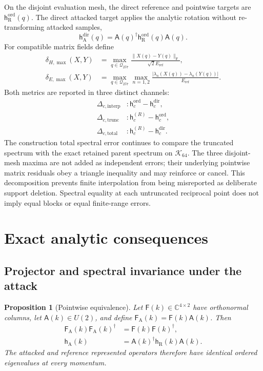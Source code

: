 \documentclass[11pt]{article}
\newcommand{\CC}{\mathbb{C}}
\newcommand{\fro}{\mathrm{F}}
\newcommand{\mat}[1]{\mathsf{#1}}
\newcommand{\eref}{E_{\mathrm{ref}}}
\newtheorem{proposition}{Proposition}
\begin{document}
On the disjoint evaluation mesh, the direct reference and pointwise targets are
$\mat h_{\mathrm R}^{\mathrm{ord}}(q)$.  The direct attacked target applies the analytic
rotation without re-transforming attacked samples,
\begin{equation}
 \mat h_{\mathrm A}^{\mathrm{dir}}(q)=
 \mat A(q)^\dagger\mat h_{\mathrm R}^{\mathrm{ord}}(q)\mat A(q).
 \label{eq:direct-attacked-target}
\end{equation}
For compatible matrix fields define
\begin{align}
 \delta_{H,\max}(X,Y)
 &=\max_{q\in\mathcal Q_{257}}
 \frac{\|X(q)-Y(q)\|_{\fro}}{\sqrt{2}\eref},\\
 \delta_{E,\max}(X,Y)
 &=\max_{q\in\mathcal Q_{257}}\max_{n=1,2}
 \frac{|\lambda_n(X(q))-\lambda_n(Y(q))|}{\eref}.
 \label{eq:error-metrics}
\end{align}
Both metrics are reported in three distinct channels:
\begin{align}
 \Delta_{c,\mathrm{interp}} &: \mat h_c^{\mathrm{ord}}-\mat h_c^{\mathrm{dir}},\\
 \Delta_{c,\mathrm{trunc}} &: \mat h_c^{(R)}-\mat h_c^{\mathrm{ord}},\\
 \Delta_{c,\mathrm{total}} &: \mat h_c^{(R)}-\mat h_c^{\mathrm{dir}}.
 \label{eq:error-channels}
\end{align}
The construction total spectral error continues to compare the truncated spectrum with
the exact retained parent spectrum on $\mathcal K_{64}$.  The three disjoint-mesh
maxima are not added as independent errors; their underlying pointwise matrix residuals
obey a triangle inequality and may reinforce or cancel.  This decomposition prevents
finite interpolation from being misreported as deliberate support deletion.  Spectral
equality at each untruncated reciprocal point does not imply equal blocks or equal
finite-range errors.

\section{Exact analytic consequences}

\subsection{Projector and spectral invariance under the attack}

\begin{proposition}[Pointwise equivalence]
Let $\mat F(k)\in\CC^{4\times2}$ have orthonormal columns, let
$\mat A(k)\in U(2)$, and define
$\mat F_{\mathrm A}(k)=\mat F(k)\mat A(k)$.  Then
\begin{align}
 \mat F_{\mathrm A}(k)\mat F_{\mathrm A}(k)^{\dagger}
 &=\mat F(k)\mat F(k)^{\dagger},\\
 \mat h_{\mathrm A}(k)
 &=\mat A(k)^{\dagger}\mat h_{\mathrm R}(k)\mat A(k).
 \label{eq:similarity}
\end{align}
The attacked and reference represented operators therefore have identical ordered
eigenvalues at every momentum.
\end{proposition}
\end{document}
